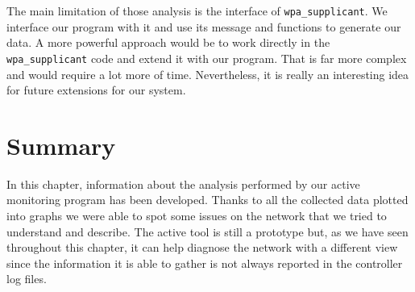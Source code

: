 The main limitation of those analysis is the interface of \texttt{wpa\_supplicant}. We interface our program with it and use its message and functions to generate our data. A more powerful approach would be to work directly in the \texttt{wpa\_supplicant} code and extend it with our program. That is far more complex and would require a lot more of time. Nevertheless, it is really an interesting idea for future extensions for our system.

\section{Summary}
In this chapter, information about the analysis performed by our active monitoring program has been developed. Thanks to all the collected data plotted into graphs we were able to spot some issues on the network that we tried to understand and describe. The active tool is still a prototype but, as we have seen throughout this chapter, it can help diagnose the network with a different view since the information it is able to gather is not always reported in the controller log files.
